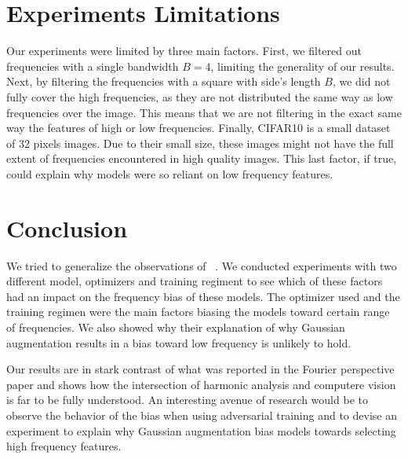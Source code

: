 \documentclass{article} \author{Simon Théorêt}
\begin{document}
\section{Experiments Limitations}
Our experiments were limited by three main factors. First, we filtered
out frequencies with a single bandwidth $B=4$, limiting the generality
of our results. Next, by filtering the frequencies with a square with
side's length $B$, we did not fully cover the high frequencies, as
they are not distributed the same way as low frequencies over the
image. This means that we are not filtering in the exact same way the
features of high or low frequencies. Finally, CIFAR10 is a small
dataset of 32 pixels images. Due to their small size, these images
might not have the full extent of frequencies encountered in high
quality images. This last factor, if true, could explain why models
were so reliant on low frequency features.

\section{Conclusion}
We tried to generalize the observations of ~\citep{yin2020fourier}.
We conducted experiments with two different model, optimizers and
training regiment to see which of these factors had an impact on the
frequency bias of these models. The optimizer used and the training
regimen were the main factors biasing the models toward certain range
of frequencies. We also showed why their explanation of why Gaussian
augmentation results in a bias toward low frequency is unlikely to
hold.

Our results are in stark contrast of what was reported in the Fourier
perspective paper and shows how the intersection of harmonic analysis
and computere vision is far to be fully understood. An interesting
avenue of research would be to observe the behavior of the bias when
using adversarial training and to devise an experiment to explain why
Gaussian augmentation bias models towards selecting high frequency
features.

\end{document}
